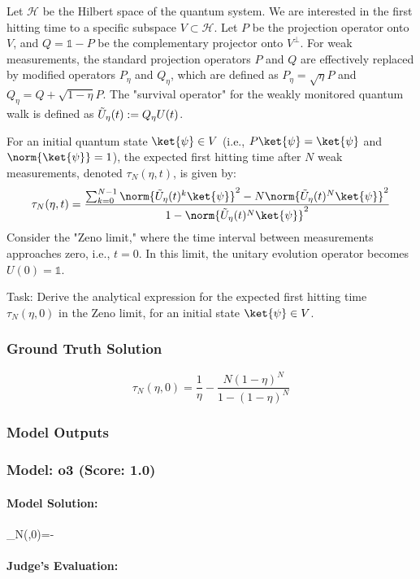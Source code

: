 \documentclass[10pt]{article}
\begin{document}
Let $\mathcal{H}$ be the Hilbert space of the quantum system. We are interested in the first hitting time to a specific subspace $V \subset \mathcal{H}$. Let $P$ be the projection operator onto $V$, and $Q = \mathds{1}-P$ be the complementary projector onto $V^{\perp}$. For weak measurements, the standard projection operators $P$ and $Q$ are effectively replaced by modified operators $P_{\eta}$ and $Q_{\eta}$, which are defined as $P_{\eta} = \sqrt{\eta}P$ and $Q_{\eta} = Q + \sqrt{1-\eta}P$. The "survival operator" for the weakly monitored quantum walk is defined as $\Tilde{U}_{\eta}(t) := Q_{\eta}U(t)$.

For an initial quantum state $\ket{\psi} \in V$ (i.e., $P\ket{\psi} = \ket{\psi}$ and $\norm{\ket{\psi}}=1$), the expected first hitting time after $N$ weak measurements, denoted $\tau_N(\eta,t)$, is given by:
$$
\tau_N(\eta,t) = \frac{\sum_{k=0}^{N-1}\norm{\Tilde{U}_{\eta}(t)^k\ket{\psi}}^2 - N \norm{\Tilde{U}_{\eta}(t)^N\ket{\psi}}^2}{1-\norm{\Tilde{U}_{\eta}(t)^N\ket{\psi}}^2}
$$
Consider the "Zeno limit," where the time interval between measurements approaches zero, i.e., $t=0$. In this limit, the unitary evolution operator becomes $U(0)=\mathds{1}$.

Task:
Derive the analytical expression for the expected first hitting time $\tau_N(\eta,0)$ in the Zeno limit, for an initial state $\ket{\psi} \in V$.

\subsubsection*{Ground Truth Solution}
\[ \boxed{\tau_N(\eta,0)=\frac{1}{\eta} - \frac{N (1-\eta)^N}{1-(1-\eta)^N}} \]

\subsubsection*{Model Outputs}
\subsubsection*{Model: o3 (Score: 1.0)}
\paragraph*{Model Solution:}
\displaystyle 
\tau_N(\eta,0)=-

\paragraph*{Judge's Evaluation:}
\end{document}
